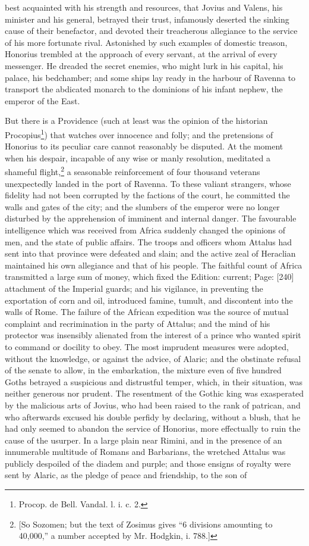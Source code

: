 best acquainted with his strength and resources, that Jovius and Valens, his minister and his general, betrayed their trust, infamously deserted the sinking cause of their benefactor, and devoted their treacherous allegiance to the service of his more fortunate rival. Astonished by such examples of domestic treason, Honorius trembled at the approach of every servant, at the arrival of every messenger. He dreaded the secret enemies, who might lurk in his capital, his palace, his bedchamber; and some ships lay ready in the harbour of Ravenna to transport the abdicated monarch to the dominions of his infant nephew, the emperor of the East.

But there is a Providence (such at least was the opinion of the historian Procopius\footnote{Procop. de Bell. Vandal. l. i. c. 2.}) that watches over innocence and folly; and the pretensions of Honorius to its peculiar care cannot reasonably be disputed. At the moment when his despair, incapable of any wise or manly resolution, meditated a shameful flight,\footnote{[So Sozomen; but the text of Zosimus gives \texthebrew{“}6 divisions amounting to 40,000,\texthebrew{}” a number accepted by Mr. Hodgkin, i. 788.]} a seasonable reinforcement of four thousand veterans unexpectedly landed in the port of Ravenna. To these valiant strangers, whose fidelity had not been corrupted by the factions of the court, he committed the walls and gates of the city; and the slumbers of the emperor were no longer disturbed by the apprehension of imminent and internal danger. The favourable intelligence which was received from Africa suddenly changed the opinions of men, and the state of public affairs. The troops and officers whom Attalus had sent into that province were defeated and slain; and the active zeal of Heraclian maintained his own allegiance and that of his people. The faithful count of Africa transmitted a large sum of money, which fixed the Edition: current; Page: [240] attachment of the Imperial guards; and his vigilance, in preventing the exportation of corn and oil, introduced famine, tumult, and discontent into the walls of Rome. The failure of the African expedition was the source of mutual complaint and recrimination in the party of Attalus; and the mind of his protector was insensibly alienated from the interest of a prince who wanted spirit to command or docility to obey. The most imprudent measures were adopted, without the knowledge, or against the advice, of Alaric; and the obstinate refusal of the senate to allow, in the embarkation, the mixture even of five hundred Goths betrayed a suspicious and distrustful temper, which, in their situation, was neither generous nor prudent. The resentment of the Gothic king was exasperated by the malicious arts of Jovius, who had been raised to the rank of patrican, and who afterwards excused his double perfidy by declaring, without a blush, that he had only seemed to abandon the service of Honorius, more effectually to ruin the cause of the usurper. In a large plain near Rimini, and in the presence of an innumerable multitude of Romans and Barbarians, the wretched Attalus was publicly despoiled of the diadem and purple; and those ensigns of royalty were sent by Alaric, as the pledge of peace and friendship, to the son of 